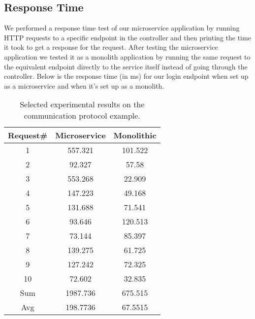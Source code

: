 \subsection{Response Time}
We performed a response time test of our microservice application by running HTTP requests to a specific endpoint in the controller and then printing the time it took to get a response for the request. After testing the microservice application we tested it as a monolith application by running the same request to the equivalent endpoint directly to the service itself instead of going through the controller. Below is the response time (in ms) for our login endpoint when set up as a microservice and when it’s set up as a monolith. \\

\begin{table}[ht]
\centering
\begin{tabular}{ccc}
  Request# & Microservice & Monolithic
  \\ \hline
1 & 557.321  &    101.522 \\
2 & 92.327   &    57.58 \\
3 & 553.268  &    22.909 \\
4 & 147.223   &    49.168 \\
5 & 131.688   &    71.541 \\
6 & 93.646   &    120.513 \\
7 & 73.144   &    85.397 \\
8 & 139.275   &    61.725 \\
9 & 127.242   &    72.325 \\
10 & 72.602   &    32.835 \\
\hline
Sum & 1987.736   &    675.515 \\
Avg & 198.7736   &    67.5515 \\

\end{tabular}
\caption{Selected experimental results on the communication protocol example.}
\label{tab:results}
\end{table}

